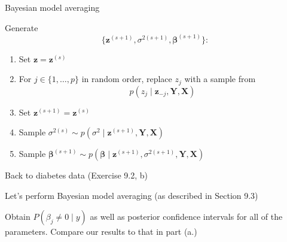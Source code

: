 \documentclass[ignorenonframetext,]{beamer}
\newcommand{\bz}   {\bm{z}}
\newcommand{\bY}   {\bm{Y}}
\newcommand{\bbeta}{\bm{\beta}}
\newcommand{\bX}   {\bm{X}}
\begin{document}
\begin{frame}{Bayesian model averaging}

Generate \[\{ \bz^{(s+1)}, \sigma^{2(s+1)}, \bbeta^{(s+1)} \}:\]

\begin{enumerate}
\item Set $\bz = \bz^{(s)}$
\item For $j \in \{1,\ldots, p\}$ in random order, replace $z_j$ with a sample from 
$$p(z_j \mid \bz_{-j}, \bY, \bX)$$
\item Set $\bz^{(s+1)} = \bz^{(s)}$
\item Sample $\sigma^{2(s)} \sim p(\sigma^2 \mid \bz^{(s+1)}, \bY, \bX)$
\item Sample $\bbeta^{(s+1)} \sim p(\bbeta \mid \bz^{(s+1)}, \sigma^{2(s+1)}, \bY, \bX)$
\end{enumerate}

\end{frame}

\begin{frame}{Back to diabetes data (Exercise 9.2, b)}

Let's perform Bayesian model averaging (as described in Section 9.3)

Obtain \(P(\beta_j \neq 0 \mid y)\) as well as posterior confidence
intervals for all of the parameters. Compare our results to that in part
(a.)

\end{frame}
\end{document}
